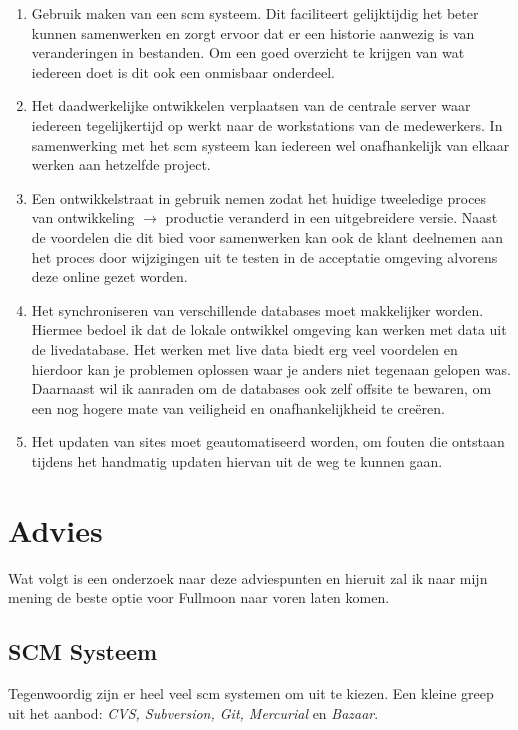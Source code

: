 \documentclass[12pt,a4paper]{article}
\begin{document}
  \begin{enumerate}
    \item Gebruik maken van een {\sc scm} systeem. Dit faciliteert gelijktijdig het beter kunnen 
    samenwerken en zorgt ervoor dat er een historie aanwezig is van veranderingen in bestanden. Om een 
    goed overzicht te krijgen van wat iedereen doet is dit ook een onmisbaar onderdeel.
    \item Het daadwerkelijke ontwikkelen verplaatsen van de centrale server waar iedereen tegelijkertijd op werkt naar de workstations van de medewerkers. In samenwerking met het {\sc scm} systeem kan iedereen wel onafhankelijk van elkaar werken aan hetzelfde project.
    \item Een ontwikkelstraat in gebruik nemen zodat het huidige tweeledige proces van ontwikkeling $\to$ productie veranderd in een uitgebreidere versie. Naast de voordelen die dit bied voor samenwerken kan ook de klant deelnemen aan het proces door wijzigingen uit te testen in de acceptatie omgeving alvorens deze online gezet worden.
    \item Het synchroniseren van verschillende databases moet makkelijker worden. Hiermee bedoel ik dat de lokale ontwikkel omgeving kan werken met data uit de livedatabase. Het werken met live data biedt erg veel voordelen en hierdoor kan je problemen oplossen waar je anders niet tegenaan gelopen was. Daarnaast wil ik aanraden om de databases ook zelf offsite te bewaren, om een nog hogere mate van veiligheid en onafhankelijkheid te cre\"{e}ren.
    \item Het updaten van sites moet geautomatiseerd worden, om fouten die ontstaan tijdens het handmatig updaten hiervan uit de weg te kunnen gaan.
  \end{enumerate}
  
  \section{Advies}

  Wat volgt is een onderzoek naar deze adviespunten en hieruit zal ik naar mijn mening de beste optie voor Fullmoon naar voren laten komen.
  
    \subsection{SCM Systeem}
    
    Tegenwoordig zijn er heel veel {\sc scm} systemen om uit te kiezen. Een kleine greep uit het aanbod: \emph{CVS, Subversion, Git, Mercurial} en \emph{Bazaar}.
    
\end{document}
